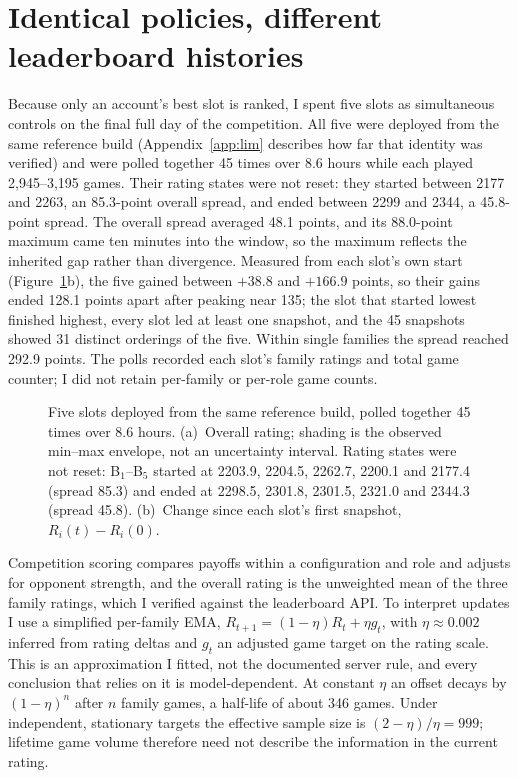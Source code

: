 \documentclass{article}
\begin{document}
\section{Identical policies, different leaderboard histories}
\label{sec:noise}
Because only an account's best slot is ranked, I spent five slots as simultaneous
controls on the final full day of the competition. All five were deployed from the same reference build
(Appendix~\ref{app:lim} describes how far that identity was verified) and were
polled together 45 times over 8.6 hours while each played 2,945--3,195 games.
Their rating states were not reset: they started between 2177 and 2263, an
85.3-point overall spread, and ended between 2299 and 2344, a 45.8-point spread.
The overall spread averaged 48.1 points, and its 88.0-point maximum came ten
minutes into the window, so the maximum reflects the inherited gap rather than
divergence. Measured from each slot's own start (Figure~\ref{fig:noise}b), the
five gained between $+38.8$ and $+166.9$ points, so their gains ended 128.1
points apart after peaking near 135; the slot that started lowest finished
highest, every slot led at least one snapshot, and the 45 snapshots showed 31
distinct orderings of the five. Within single families the spread reached 292.9
points. The polls recorded each slot's family ratings and total game counter; I
did not retain per-family or per-role game counts.

\begin{figure}[t]
\centering

\caption{Five slots deployed from the same reference build, polled together 45
times over 8.6 hours. (a)~Overall rating; shading is the observed min--max envelope, not an
uncertainty interval. Rating states were not reset: B$_1$--B$_5$ started at 2203.9,
2204.5, 2262.7, 2200.1 and 2177.4 (spread 85.3) and ended at 2298.5, 2301.8,
2301.5, 2321.0 and 2344.3 (spread 45.8). (b)~Change since each slot's first snapshot,
$R_i(t)-R_i(0)$.}
\label{fig:noise}
\end{figure}

Competition scoring compares payoffs within a configuration and role and adjusts
for opponent strength, and the overall rating is the unweighted mean of the three
family ratings, which I verified against the leaderboard API. To interpret
updates I use a simplified per-family EMA, $R_{t+1}=(1-\eta)R_t+\eta g_t$, with
$\eta\approx0.002$ inferred from rating deltas and $g_t$ an adjusted game target
on the rating scale. This is an approximation I fitted, not the documented server
rule, and every conclusion that relies on it is model-dependent. At constant
$\eta$ an offset decays by $(1-\eta)^n$ after $n$ family games, a half-life of
about 346 games. Under independent, stationary targets the effective sample size
is $(2-\eta)/\eta=999$; lifetime game volume therefore need not describe the
information in the current rating.
\end{document}
